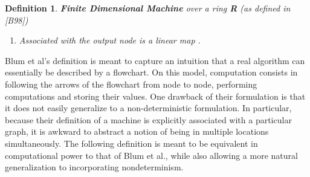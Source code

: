 \documentclass[twoside]{article}
\renewcommand{\cite}[1]{[#1]}
\newtheorem{definition}{Definition}[section]
\begin{document}
\begin{definition}{\textbf{Finite Dimensional Machine} over a ring
    \textbf{R} (as defined in \cite{B98})}
\begin{enumerate}
  \item Associated with the output node is a linear map
    .
    
  \end{enumerate}
\end{definition}

Blum et al's definition is meant to capture an intuition that a real
algorithm can essentially be described by a flowchart.  On this model,
computation consists in following the arrows of the flowchart from
node to node, performing computations and storing their values.  One
drawback of their formulation is that it does not easily generalize to
a non-deterministic formulation.  In particular, because their
definition of a machine is explicitly associated with a particular
graph, it is awkward to abstract a notion of being in multiple
locations simultaneously.  The following definition is meant to be
equivalent in computational power to that of Blum et al., while also
allowing a more natural generalization to incorporating nondeterminism.
\end{document}
